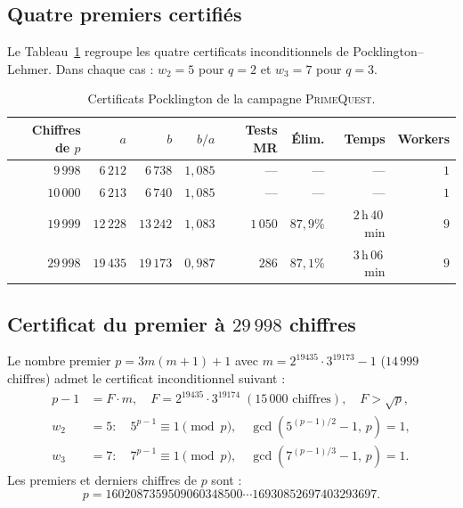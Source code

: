 \documentclass[11pt,a4paper]{article}
\theoremstyle{definition}
\theoremstyle{remark}
\begin{document}
\subsection{Quatre premiers certifiés}

\begin{resultbox}
Le Tableau~\ref{tab:resultats} regroupe les quatre certificats
inconditionnels de Pocklington--Lehmer. Dans chaque cas :
$w_2=5$ pour $q=2$ et $w_3=7$ pour $q=3$.
\end{resultbox}

\begin{table}[ht]\centering
\caption{Certificats Pocklington de la campagne \textsc{PrimeQuest}.}
\label{tab:resultats}
\begin{tabular}{@{}rrrrrrrr@{}}
\toprule
Chiffres de $p$ & $a$ & $b$ & $b/a$ & Tests MR & Élim. & Temps & Workers \\
\midrule
$9\,998$  & $6\,212$  & $6\,738$  & $1{,}085$ & ---      & ---      & ---             & $1$ \\
$10\,000$ & $6\,213$  & $6\,740$  & $1{,}085$ & ---      & ---      & ---             & $1$ \\
$19\,999$ & $12\,228$ & $13\,242$ & $1{,}083$ & $1\,050$ & $87{,}9\%$ & $2$\,h\,$40$\,min & $9$ \\
$29\,998$ & $19\,435$ & $19\,173$ & $0{,}987$ & $286$    & $87{,}1\%$ & $3$\,h\,$06$\,min & $9$ \\
\bottomrule
\end{tabular}
\end{table}

\subsection{Certificat du premier à $29\,998$ chiffres}

\begin{rigorousbox}
Le nombre premier $p = 3m(m+1)+1$ avec $m = 2^{19435}\cdot 3^{19173}-1$
($14\,999$ chiffres) admet le certificat inconditionnel suivant :
\begin{align*}
  p-1 &= F\cdot m,\quad F = 2^{19435}\cdot 3^{19174}
         \;(15\,000\text{ chiffres}),\quad F>\sqrt{p}, \\
  w_2 &= 5:\quad 5^{p-1}\equiv 1\pmod{p},\quad
         \gcd(5^{(p-1)/2}-1,\,p)=1, \\
  w_3 &= 7:\quad 7^{p-1}\equiv 1\pmod{p},\quad
         \gcd(7^{(p-1)/3}-1,\,p)=1.
\end{align*}
Les premiers et derniers chiffres de $p$ sont :
\[
  p = 1602087359509060348500\cdots 16930852697403293697.
\]
\end{rigorousbox}
\end{document}
